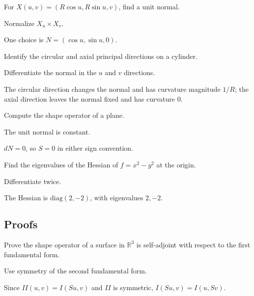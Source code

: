 \begin{exercise}\label{exr:vii16-ped-02}
For \(X(u,v)=(R\cos u,R\sin u,v)\), find a unit normal.
\end{exercise}
\begin{hint}
Normalize \(X_u\times X_v\).
\end{hint}
\begin{solution}
One choice is \(N=(\cos u,\sin u,0)\).
\end{solution}

\begin{exercise}\label{exr:vii16-ped-03}
Identify the circular and axial principal directions on a cylinder.
\end{exercise}
\begin{hint}
Differentiate the normal in the \(u\) and \(v\) directions.
\end{hint}
\begin{solution}
The circular direction changes the normal and has curvature magnitude \(1/R\); the axial direction leaves the normal fixed and has curvature \(0\).
\end{solution}

\begin{exercise}\label{exr:vii16-ped-04}
Compute the shape operator of a plane.
\end{exercise}
\begin{hint}
The unit normal is constant.
\end{hint}
\begin{solution}
\(dN=0\), so \(S=0\) in either sign convention.
\end{solution}

\begin{exercise}\label{exr:vii16-ped-05}
Find the eigenvalues of the Hessian of \(f=x^2-y^2\) at the origin.
\end{exercise}
\begin{hint}
Differentiate twice.
\end{hint}
\begin{solution}
The Hessian is \(\mathrm{diag}(2,-2)\), with eigenvalues \(2,-2\).
\end{solution}

\subsection*{Proofs}

\begin{exercise}\label{exr:vii16-ped-06}
Prove the shape operator of a surface in \(\mathbb R^3\) is self-adjoint with respect to the first fundamental form.
\end{exercise}
\begin{hint}
Use symmetry of the second fundamental form.
\end{hint}
\begin{solution}
Since \(II(u,v)=I(Su,v)\) and \(II\) is symmetric, \(I(Su,v)=I(u,Sv)\).
\end{solution}

